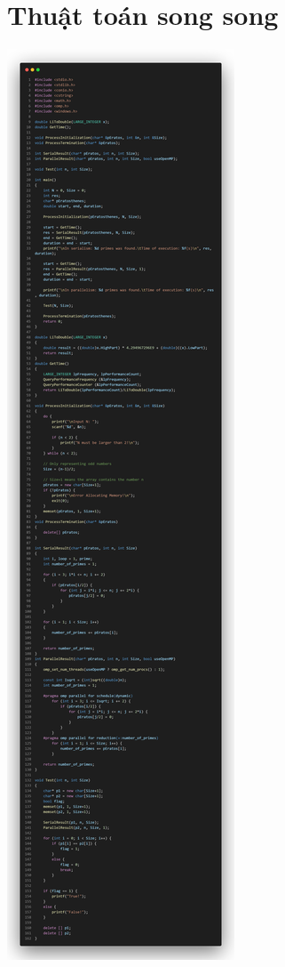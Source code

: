 \documentclass[12pt,a4paper]{report}
\begin{document}
\section{Thuật toán song song}
\begin{center}
	\includegraphics[trim=0in 68in 0in 0in, clip, scale=0.2]{./Photos/Primes/Parallel.PNG}

\end{center}
\end{document}
